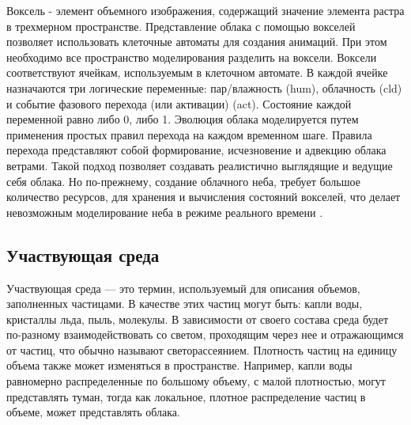 Воксель - элемент объемного изображения, содержащий значение элемента растра в трехмерном пространстве.
Представление облака с помощью вокселей позволяет использовать клеточные автоматы для создания анимаций. При этом необходимо все пространство моделирования разделить на воксели. Воксели
соответствуют ячейкам, используемым в клеточном автомате. В каждой ячейке
назначаются три логические переменные: пар/влажность (hum), облачность (cld)
и событие фазового перехода (или активации) (act). Состояние каждой
переменной равно либо 0, либо 1. Эволюция облака моделируется путем
применения простых правил перехода на каждом временном шаге. Правила
перехода представляют собой формирование, исчезновение и адвекцию облака ветрами.
Такой подход позволяет создавать реалистично выглядящие и ведущие себя облака. Но по-прежнему, создание облачного неба, требует большое количество ресурсов, для хранения и вычисления состояний вокселей, что делает невозможным моделирование неба в режиме реального времени \cite{voxel}.

\subsection{Участвующая среда} 

Участвующая среда — это термин, используемый для описания объемов, заполненных частицами. В качестве этих частиц могут быть: капли воды, кристаллы льда, пыль, молекулы. В зависимости от своего состава среда будет по-разному взаимодействовать со светом, проходящим через нее и отражающимся от частиц, что обычно называют светорассеянием. Плотность частиц на единицу объема также может изменяться в пространстве. Например, капли воды равномерно распределенные по большому объему, с малой плотностью, могут представлять туман, тогда как локальное, плотное распределение частиц в объеме, может представлять облака.



